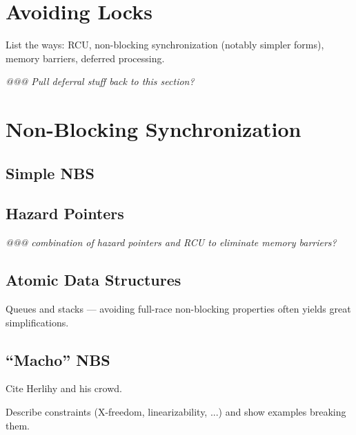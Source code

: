 

\section{Avoiding Locks}
\label{sec:advsync:Avoiding Locks}

List the ways: RCU, non-blocking synchronization (notably simpler forms),
memory barriers, deferred processing.

\emph{@@@ Pull deferral stuff back to this section?}



\section{Non-Blocking Synchronization}
\label{sec:advsync:Non-Blocking Synchronization}

\subsection{Simple NBS}
\label{sec:advsync:Simple NBS}

\subsection{Hazard Pointers}
\label{sec:advsync:Hazard Pointers}

\emph{@@@ combination of hazard pointers and RCU to eliminate memory barriers?}

\subsection{Atomic Data Structures}
\label{sec:advsync:Atomic Data Structures}

Queues and stacks --- avoiding full-race non-blocking properties
often yields great simplifications.

\subsection{``Macho'' NBS}
\label{sec:advsync:``Macho'' NBS}

Cite Herlihy and his crowd.

Describe constraints (X-freedom, linearizability, ...) and show examples
breaking them.
